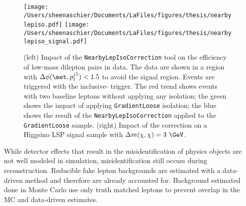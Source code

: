  \begin{figure}[tbp]
  \texttt{[image: /Users/sheenaschier/Documents/LaFiles/figures/thesis/nearbylepiso.pdf]}
   \texttt{[image: /Users/sheenaschier/Documents/LaFiles/figures/thesis/nearbylepiso\_signal.pdf]}
  \caption{(left) Impact of the \texttt{NearbyLepIsoCorrection} tool on the efficiency of low-mass dilepton pairs in data.  The data are shown in a region with $\Delta\phi(\met, p_{t}^{j1})<1.5$ to avoid the signal region.  Events are triggered with the inclusive-\met{} trigger.  The red trend shows events with two baseline leptons without applying any isolation; the green shows the impact of applying \texttt{GradientLoose} isolation; the blue shows the result of the \texttt{NearbyLepIsoCorrection} applied to the \texttt{GradientLoose} sample.  (right) Impact of the correction on a Higgsino LSP signal sample with $\Delta m(\chi,\chi)=3~\GeV$.}
 \label{fig:nearbylepiso}
 \end{figure}
 
 While detector effects that result in the misidentification of physics objects are not well modeled in simulation, misidentification still occurs during reconstruction.  Reducible fake lepton backgrounds are estimated with a data-driven method and therefore are already accounted for.  Background estimated done in Monte Carlo use only truth matched leptons to prevent overlap in the MC and data-driven estimates. 
 
 


